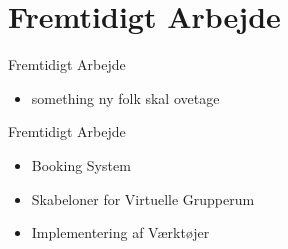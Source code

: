 \section*{Fremtidigt Arbejde}

\begin{frame}{Fremtidigt Arbejde}
	
	\begin{itemize}
		\item something ny folk skal ovetage
	\end{itemize}
	
\end{frame}


\begin{frame}{Fremtidigt Arbejde}
	
	\begin{itemize}
		\item <1-> Booking System
		\item <2-> Skabeloner for Virtuelle Grupperum
		\item <3-> Implementering af V\ae{}rkt\o{}jer
	\end{itemize}
	 
\end{frame}